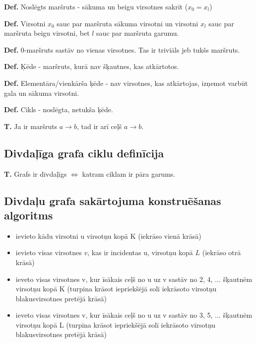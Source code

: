 \documentclass{article}
\begin{document}
\textbf{Def.} Noslēgts maršruts - sākuma un beigu virsotnes sakrīt ($x_0 = x_l$)

\textbf{Def.}  Virsotni $x_0$ sauc par maršruta sākuma virsotni un virsotni $x_l$ sauc par maršruta beigu virsotni, bet $l$ sauc par maršruta garumu.

\textbf{Def.}  0-maršruts sastāv no vienas virsotnes. Tas ir triviāls jeb tukšs maršruts.

\textbf{Def.} Ķēde - maršruts, kurā nav šķautnes, kas atkārtotos. 

\textbf{Def.} Elementāra/vienkārša ķēde - nav virsotnes, kas atkārtojas, izņemot varbūt gala un sākuma virsotni.

\textbf{Def.} Cikls - noslēgta, netukša ķēde. 

\textbf{T.}  Ja ir maršruts $ a \to b$, tad ir arī ceļš $a \to b.$ 


\subsection{Divdaļīga grafa ciklu definīcija}

\textbf{T.}  Grafs ir divdaļīgs $\Leftrightarrow$ katram ciklam ir pāra garums. 

\subsection{Divdaļu grafa sakārtojuma konstruēšanas algoritms}
\begin{itemize}
	\item ievieto kādu virsotni u virsotņu kopā K (iekrāso vienā krāsā)
	\item ievieto visas virsotnes $v$, kas ir incidentas u, virsotņu kopā $L$ (iekrāso otrā krāsā)
	\item ieveto visas virsotnes v, kur īsākais ceļš no u uz v sastāv no 2, 4, ...  šķautnēm virsotņu kopā K (turpina krāsot iepriekšējā solī iekrāsoto virsotņu blakusvirsotnes pretējā krāsā)
	\item ieveto visas virsotnes v, kur īsākais ceļš no u uz v sastāv no 3, 5, ...  šķautnēm virsotņu kopā L (turpina krāsot iepriekšējā solī iekrāsoto virsotņu blakusvirsotnes pretējā krāsā)
\end{itemize}
\end{document}
